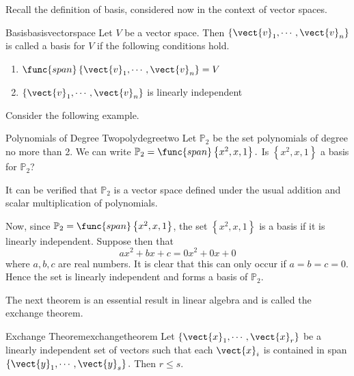 Recall the definition of basis, considered now in the context of vector spaces.

\begin{definition}{Basis}{basisvectorspace}
Let $V$ be a vector space. Then $\{\vect{v}_{1},\cdots ,\vect{v}_{n}\}$ is called a basis
 for $V$ if the following conditions hold.
\begin{enumerate}
\item
$\func{span}\left\{ \vect{v}_{1},\cdots ,\vect{v}_{n}\right\} = V$
\item
$\{\vect{v}_{1},\cdots ,\vect{v}_{n}\}$ is linearly independent
\end{enumerate}
\end{definition}

Consider the following example.

\begin{example}{Polynomials of Degree Two}{polydegreetwo}
Let $\mathbb{P}_2$ be the set polynomials of degree no more than 2. We can write
$\mathbb{P}_2=\func{span}\left\{ x^{2}, x, 1\right\} .$ Is $\left\{ x^{2}, x, 1\right\} $ a
basis for $\mathbb{P}_2$?
\end{example}

\begin{solution}
It can be verified that $\mathbb{P}_2$ is a vector space defined under the usual addition and scalar multiplication of polynomials. 

Now, since $\mathbb{P}_2=\func{span}\left\{ x^{2},x, 1\right\}$, the set  $\left\{ x^{2}, x, 1\right\} $ is a basis if it is linearly independent. Suppose then that 
\begin{equation*}
ax^{2}+bx+c=0x^2 + 0x + 0 
\end{equation*}
where $a,b,c$ are real numbers. It is clear that this can only occur if $a=b=c=0$. Hence the set is linearly independent and forms a basis of $\mathbb{P}_2$.
\end{solution}

The next theorem is an essential result in linear algebra and is called the exchange theorem. 

\begin{theorem}{Exchange Theorem}{exchangetheorem}
Let $\left\{ \vect{x}_{1},\cdots ,\vect{x}_{r}\right\} $
be a linearly independent set of vectors such that each $\vect{x}_{i}$ is
contained in span$\left\{ \vect{y}_{1},\cdots ,\vect{y}_{s}\right\} .$ Then $
r\leq s.$
\end{theorem}

